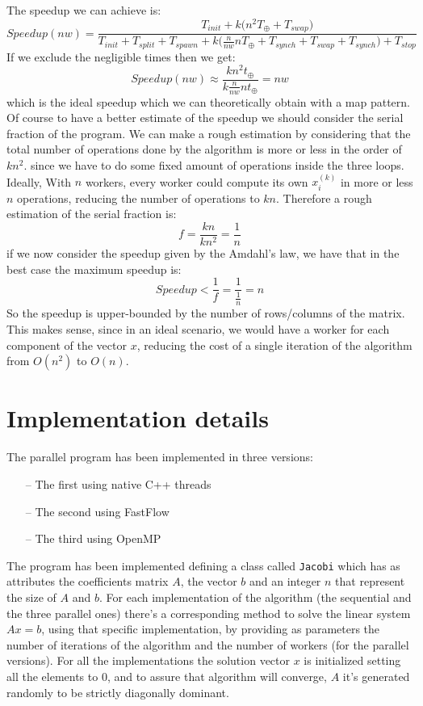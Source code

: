 \documentclass[12pt]{article}
\begin{document}
	The speedup we can achieve is:
	\[ Speedup(nw) = \frac{T_{init} + k\Big(n^2T_\oplus + T_{swap}\Big)}{T_{init} + T_{split} + T_{spawn} + k\Big(\frac{n}{nw}nT_\oplus + T_{synch} + T_{swap} + T_{synch}\Big) + T_{stop}}\]
	If we exclude the negligible times then we get:
	\[ Speedup(nw) \approx \frac{kn^2t_\oplus}{k\frac{n}{nw}nt_\oplus} = nw\]
	which is the ideal speedup which we can theoretically obtain with a map pattern. Of course to have a better estimate of the speedup we should consider the serial fraction of the program. We can make a rough estimation by considering that the total number of operations done by the algorithm is more or less in the order of $kn^2$. since we have to do some fixed amount of operations inside the three loops. Ideally, With $n$ workers, every worker could compute its own $x_i^{(k)}$ in more or less $n$ operations, reducing the number of operations to $kn$. Therefore a rough estimation of the serial fraction is:
	\[ f = \frac{kn}{kn^2} = \frac{1}{n}\]
	if we now consider the speedup given by the Amdahl's law, we have that in the best case the maximum speedup is:
	\[ Speedup < \frac{1}{f} = \frac{1}{\frac{1}{n}} = n\]
	So the speedup is upper-bounded by the number of rows/columns of the matrix. This makes sense, since in an ideal scenario, we would have a worker for each component of the vector $x$, reducing the cost of a single iteration of the algorithm from $O(n^2)$ to $O(n)$.
	
	\section{Implementation details}
	The parallel program has been implemented in three versions:
	\begin{itemize}
		\item[--] The first using native C++ threads 
		\item[--] The second using FastFlow
		\item[--] The third using OpenMP
	\end{itemize}
	The program has been implemented defining a class called \verb|Jacobi| which has as attributes the coefficients matrix $A$, the vector $b$ and an integer $n$ that represent the size of $A$ and $b$. For each implementation of the algorithm (the sequential and the three parallel ones) there's a corresponding method to solve the linear system $Ax = b$, using that specific implementation, by providing as parameters the number of iterations of the algorithm and the number of workers (for the parallel versions). For all the implementations the solution vector $x$ is initialized setting all the elements to 0, and to assure that algorithm will converge, $A$ it's generated randomly to be strictly diagonally dominant. 
\end{document}
